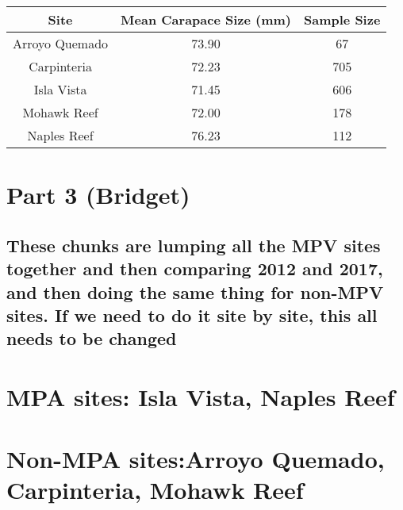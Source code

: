 \documentclass[]{article}
\begin{document}
\begin{table}[H]
\centering
\begin{tabular}{c|c|c}
\hline
Site & Mean Carapace Size (mm) & Sample Size\\
\hline
Arroyo Quemado & 73.90 & 67\\
\hline
Carpinteria & 72.23 & 705\\
\hline
Isla Vista & 71.45 & 606\\
\hline
Mohawk Reef & 72.00 & 178\\
\hline
Naples Reef & 76.23 & 112\\
\hline
\end{tabular}
\end{table}

\section{Part 3 (Bridget)}\label{part-3-bridget}

\subsection{These chunks are lumping all the MPV sites together and then
comparing 2012 and 2017, and then doing the same thing for non-MPV
sites. If we need to do it site by site, this all needs to be
changed}\label{these-chunks-are-lumping-all-the-mpv-sites-together-and-then-comparing-2012-and-2017-and-then-doing-the-same-thing-for-non-mpv-sites.-if-we-need-to-do-it-site-by-site-this-all-needs-to-be-changed}

\section{MPA sites: Isla Vista, Naples
Reef}\label{mpa-sites-isla-vista-naples-reef}

\section{Non-MPA sites:Arroyo Quemado, Carpinteria, Mohawk
Reef}\label{non-mpa-sitesarroyo-quemado-carpinteria-mohawk-reef}
\end{document}
